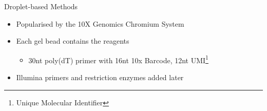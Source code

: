 \documentclass[aspectratio=169,11pt]{beamer}
\begin{document}
\begin{frame}{Droplet-based Methods}

	\begin{itemize}
		\item Popularised by the 10X Genomics Chromium System
		\item Each gel bead contains the reagents
		\begin{itemize}
			\item 30nt poly(dT) primer with 16nt 10x Barcode, 12nt UMI\footnote{Unique Molecular Identifier}
		\end{itemize}
		\item Illumina primers and restriction enzymes added later
	\end{itemize}

\end{frame}
\end{document}
